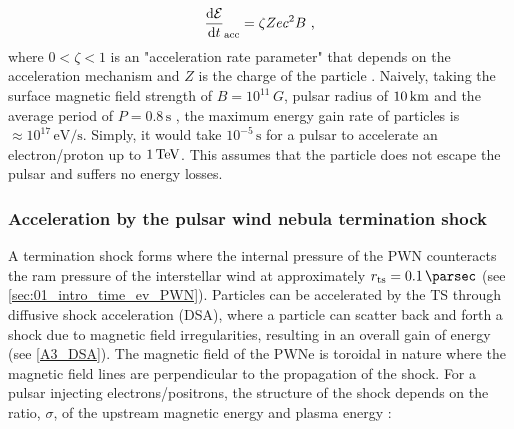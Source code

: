 \begin{equation}
    \begin{aligned}
    \dv{\mathcal{E}}{t}_\text{acc}=\zeta Zec^2B\text{ ,}
    \end{aligned}
\end{equation}
where $0<\zeta<1$ is an "acceleration rate parameter" that depends on the acceleration mechanism and $Z$ is the charge of the particle \citep{2022arXiv221116020T}. Naively, taking the surface magnetic field strength of $B=10^{11}\,\si{G}$, pulsar radius of $10\,\si{\kilo\meter}$ and the average period of $P=0.8\,\si{\second}$ \citep{2005AJ....129.1993M}, the maximum energy gain rate of particles is $\approx 10^{17}\,\si{\electronvolt\per\second}$. Simply, it would take $10^{-5}\,\si{\second}$ for a pulsar to accelerate an electron/proton up to $1\,\TeV$. This assumes that the particle does not escape the pulsar and suffers no energy losses.

\subsubsection{Acceleration by the pulsar wind nebula termination shock}

A termination shock forms where the internal pressure of the PWN counteracts the ram pressure of the interstellar wind at approximately $r_\text{ts}=0.1\,\pc$ (see \autoref{sec:01_intro_time_ev_PWN}). Particles can be accelerated by the TS through diffusive shock acceleration (DSA), where a particle can scatter back and forth a shock due to magnetic field irregularities, resulting in an overall gain of energy (see \autoref{A3_DSA}).
\newpar
The magnetic field of the PWNe is toroidal in nature where the magnetic field lines are perpendicular to the propagation of the shock. For a pulsar injecting electrons/positrons, the structure of the shock depends on the ratio, $\sigma$, of the upstream magnetic energy and plasma energy \citep{1992ApJ...391...73G}:

